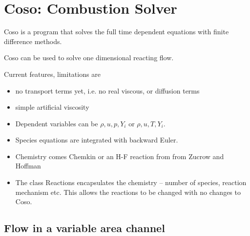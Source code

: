 \documentclass[10pt]{article}
\begin{document}
\section{Coso: Combustion Solver}

Coso is a program that solves the full time dependent equations with finite difference methods.

Coso can be used to solve one dimensional reacting flow.

\noindent Current features, limitations are
\begin{itemize}
 \item no transport terms yet, i.e. no real viscous, or diffusion terms
 \item simple artificial viscosity
 \item Dependent variables can be $\rho, u, p, Y_i$ or $\rho, u, T, Y_i$.
 \item Species equations are integrated with backward Euler.
 \item Chemistry comes Chemkin or an H-F reaction from from Zucrow and Hoffman
 \item The class Reactions encapsulates the chemistry -- number of species, reaction mechanism etc.
       This allows the reactions to be changed with no changes to Coso.
\end{itemize}


\subsection{Flow in a variable area channel}
\end{document}
